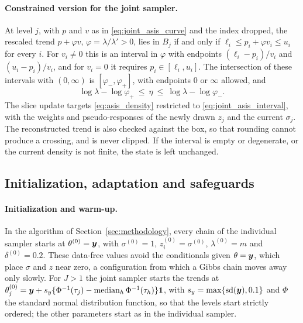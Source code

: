 \paragraph{Constrained version for the joint sampler.} At level $j$, with $p$ and $v$ as in \eqref{eq:joint_asis_curve} and the index dropped, the rescaled trend $p + \varphi v$, $\varphi = \lambda/\lambda' > 0$, lies in $B_j$ if and only if $\ell_i \le p_i + \varphi v_i \le u_i$ for every $i$. For $v_i \ne 0$ this is an interval in $\varphi$ with endpoints $(\ell_i - p_i)/v_i$ and $(u_i - p_i)/v_i$, and for $v_i = 0$ it requires $p_i \in [\ell_i, u_i]$. The intersection of these intervals with $(0, \infty)$ is $[\varphi_-, \varphi_+]$, with endpoints $0$ or $\infty$ allowed, and
\begin{equation}
\log\lambda - \log\varphi_+\ \le\ \eta\ \le\ \log\lambda - \log\varphi_- .
\label{eq:joint_asis_interval}
\end{equation}
The slice update targets \eqref{eq:asis_density} restricted to \eqref{eq:joint_asis_interval}, with the weights and pseudo-responses of the newly drawn $z_j$ and the current $\sigma_j$. The reconstructed trend is also checked against the box, so that rounding cannot produce a crossing, and is never clipped. If the interval is empty or degenerate, or the current density is not finite, the state is left unchanged.

\subsection{Initialization, adaptation and safeguards}
\label{app:pmala:init}
\label{app:pmala:adapt}
\label{app:pmala:safeguards}

\paragraph{Initialization and warm-up.} In the algorithm of Section~\ref{sec:methodology}, every chain of the individual sampler starts at $\theta^{(0)} = \bm{y}$, with $\sigma^{(0)} = 1$, $z_i^{(0)} = \sigma^{(0)}$, $\lambda^{(0)} = m$ and $\delta^{(0)} = 0.2$. These data-free values avoid the conditionals given $\theta = \bm{y}$, which place $\sigma$ and $z$ near zero, a configuration from which a Gibbs chain moves away only slowly. For $J > 1$ the joint sampler starts the trends at $\theta_j^{(0)} = \bm{y} + s_y\{\Phi^{-1}(\tau_j) - \mathrm{median}_{h}\,\Phi^{-1}(\tau_h)\}\mathbf 1$, with $s_y = \max\{\mathrm{sd}(\bm{y}), 0.1\}$ and $\Phi$ the standard normal distribution function, so that the levels start strictly ordered; the other parameters start as in the individual sampler.

